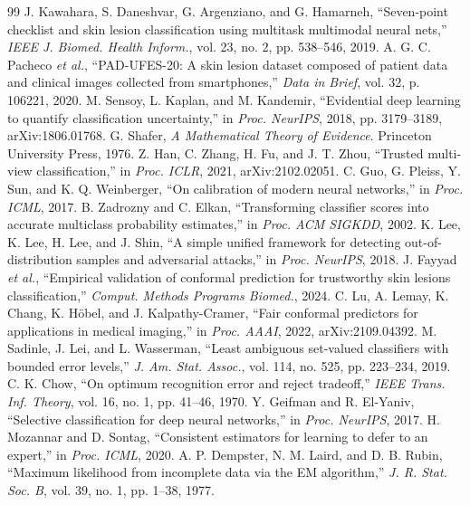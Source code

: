 \documentclass[conference]{IEEEtran}
\begin{document}
\begin{thebibliography}{99}
 J. Kawahara, S. Daneshvar, G. Argenziano, and G. Hamarneh, ``Seven-point checklist and skin lesion classification using multitask multimodal neural nets,'' \textit{IEEE J. Biomed. Health Inform.}, vol. 23, no. 2, pp. 538--546, 2019.
 A. G. C. Pacheco \textit{et al.}, ``PAD-UFES-20: A skin lesion dataset composed of patient data and clinical images collected from smartphones,'' \textit{Data in Brief}, vol. 32, p. 106221, 2020.
 M. Sensoy, L. Kaplan, and M. Kandemir, ``Evidential deep learning to quantify classification uncertainty,'' in \textit{Proc. NeurIPS}, 2018, pp. 3179--3189, arXiv:1806.01768.
 G. Shafer, \textit{A Mathematical Theory of Evidence}. Princeton University Press, 1976.
 Z. Han, C. Zhang, H. Fu, and J. T. Zhou, ``Trusted multi-view classification,'' in \textit{Proc. ICLR}, 2021, arXiv:2102.02051.
 C. Guo, G. Pleiss, Y. Sun, and K. Q. Weinberger, ``On calibration of modern neural networks,'' in \textit{Proc. ICML}, 2017.
 B. Zadrozny and C. Elkan, ``Transforming classifier scores into accurate multiclass probability estimates,'' in \textit{Proc. ACM SIGKDD}, 2002.
 K. Lee, K. Lee, H. Lee, and J. Shin, ``A simple unified framework for detecting out-of-distribution samples and adversarial attacks,'' in \textit{Proc. NeurIPS}, 2018.
 J. Fayyad \textit{et al.}, ``Empirical validation of conformal prediction for trustworthy skin lesions classification,'' \textit{Comput. Methods Programs Biomed.}, 2024.
 C. Lu, A. Lemay, K. Chang, K. H\"obel, and J. Kalpathy-Cramer, ``Fair conformal predictors for applications in medical imaging,'' in \textit{Proc. AAAI}, 2022, arXiv:2109.04392.
 M. Sadinle, J. Lei, and L. Wasserman, ``Least ambiguous set-valued classifiers with bounded error levels,'' \textit{J. Am. Stat. Assoc.}, vol. 114, no. 525, pp. 223--234, 2019.
 C. K. Chow, ``On optimum recognition error and reject tradeoff,'' \textit{IEEE Trans. Inf. Theory}, vol. 16, no. 1, pp. 41--46, 1970.
 Y. Geifman and R. El-Yaniv, ``Selective classification for deep neural networks,'' in \textit{Proc. NeurIPS}, 2017.
 H. Mozannar and D. Sontag, ``Consistent estimators for learning to defer to an expert,'' in \textit{Proc. ICML}, 2020.
 A. P. Dempster, N. M. Laird, and D. B. Rubin, ``Maximum likelihood from incomplete data via the EM algorithm,'' \textit{J. R. Stat. Soc. B}, vol. 39, no. 1, pp. 1--38, 1977.
\end{thebibliography}
\end{document}
